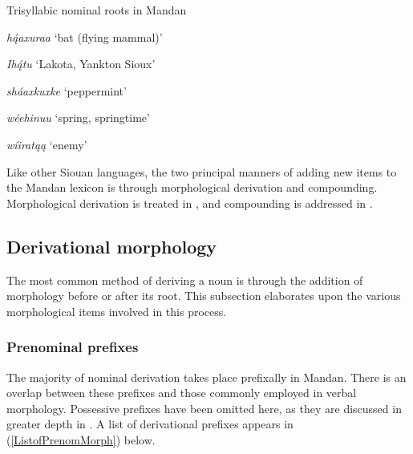 \begin{exe}
\item\label{trisyllabicroots} Trisyllabic nominal roots in Mandan

    \begin{xlist}
    
    \item \textit{hą́axuraa} `bat (flying mammal)'
    
    \item \textit{Ihą́tu} `Lakota, Yankton Sioux'
    
    \item \textit{sháaxkuxke} `peppermint'
    
    \item \textit{wéehinuu} `spring, springtime'
    
    \item \textit{wíiratąą} `enemy'
    
    \end{xlist}

\end{exe}

Like other Siouan languages, the two principal manners of adding new items to the Mandan lexicon is through morphological derivation and compounding. Morphological derivation is treated in , and compounding is addressed in .

\subsection{Derivational morphology}\label{SubSecNounDeriv}

The most common method of deriving a noun is through the addition of morphology before or after its root. This subsection elaborates upon the various morphological items involved in this process.

\subsubsection{Prenominal prefixes}\label{SubSubSecPrenominalDomain}

The majority of nominal derivation takes place prefixally in Mandan. There is an overlap between these prefixes and those commonly employed in verbal morphology. Possessive prefixes have been omitted here, as they are discussed in greater depth in . A list of derivational prefixes appears in (\ref{ListofPrenomMorph}) below.

